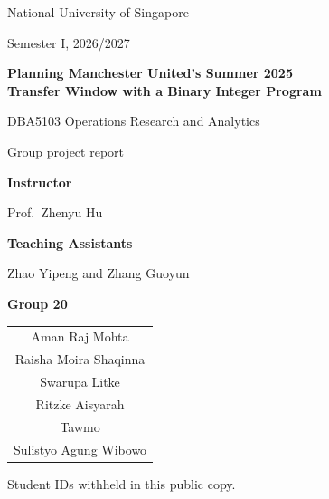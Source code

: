 \documentclass[12pt,a4paper]{article}
\renewcommand{\arraystretch}{1.15}
\begin{document}
\begin{titlepage}
\centering
{}
\setlength{\parindent}{0pt}
\setlength{\parskip}{0pt}

\vspace*{0.2cm}

{\large National University of Singapore\par}
\vspace{0.12cm}
Semester I, 2026/2027\par

\vspace{0.55cm}

{\fontsize{18}{23}\selectfont\bfseries
Planning Manchester United's Summer 2025\\[5pt]
Transfer Window with a Binary Integer Program\par}

\vspace{0.4cm}

{\large DBA5103 Operations Research and Analytics\par}
\vspace{0.12cm}
Group project report\par

\vspace{0.4cm}

\begin{minipage}{\textwidth}
\centering
\textbf{Instructor}\par
\vspace{0.1cm}
Prof.\ Zhenyu Hu\par
\vspace{0.15cm}
\textbf{Teaching Assistants}\par
\vspace{0.1cm}
Zhao Yipeng and Zhang Guoyun\par
\end{minipage}

\vspace{0.45cm}

{\large\bfseries Group 20\par}
\vspace{0.2cm}

{%
\renewcommand{\arraystretch}{1.25}
\begin{tabular}{@{}c@{}}
Aman Raj Mohta \\
Raisha Moira Shaqinna \\
Swarupa Litke \\
Ritzke Aisyarah \\
Tawmo \\
Sulistyo Agung Wibowo \\
\end{tabular}\par
\vspace{0.1cm}
{\small Student IDs withheld in this public copy.\par}
}


\end{titlepage}
\end{document}
